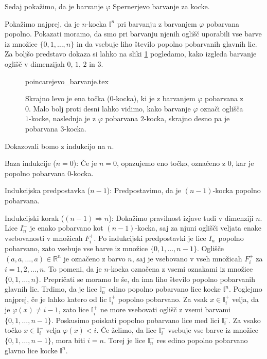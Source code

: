 \documentclass[mat1]{fmfdelo}
\newcommand{\R}{\mathbb R}
\newcommand{\I}{\mathbb I}
\newcommand{\0}{0}
\begin{document}
Sedaj pokažimo, da je barvanje $\varphi$ Spernerjevo barvanje za kocke.
\begin{dokaz}
Pokažimo najprej, da je $n$-kocka $\I^n$ pri barvanju z barvanjem $\varphi$ pobarvana popolno. Pokazati moramo, da smo pri barvanju njenih oglišč uporabili vse barve iz množice $\{ 0, 1, \dots, n \}$ in da vsebuje liho število popolno pobarvanih glavnih lic. Za boljšo predstavo dokaza si lahko na sliki \ref{fig:PMcolor} pogledamo, kako izgleda barvanje oglišč v dimenzijah $0$, $1$, $2$ in $3$.
\begin{figure}[h!]
	\centering
	{poincarejevo_barvanje.tex}
	\caption{Skrajno levo je ena točka ($0$-kocka), ki je z barvanjem $\varphi$ pobarvana z $0$. Malo bolj proti desni lahko vidimo, kako barvanje $\varphi$ označi oglišča $1$-kocke, naslednja je z $\varphi$ pobarvana $2$-kocka, skrajno desno pa je pobarvana $3$-kocka.}\label{fig:PMcolor}
\end{figure}
Dokazovali bomo z indukcijo na $n$.

Baza indukcije ($n = 0$):
Če je $n=0$, opazujemo eno točko, označeno z $0$, kar je popolno pobarvana $0$-kocka.

Indukcijska predpostavka ($n - 1$):
Predpostavimo, da je $(n - 1)$-kocka popolno pobarvana.

Indukcijski korak ($(n - 1) \Longrightarrow n$):
Dokažimo pravilnost izjave tudi v dimenziji $n$. Lice $I_n^-$ je enako pobarvano kot $(n-1)$-kocka, saj za njuni oglišči veljata enake vsebovanosti v množicah $F_i^+$. Po indukcijski predpostavki je lice $I_n^-$ popolno pobarvano, zato vsebuje vse barve iz množice $\{ 0, 1, \dots, n-1\}$. Oglišče $(a, a, \dots, a) \in \R^n$ je označeno z barvo $n$, saj je vsebovano v vseh množicah $F_i^+$ za $i = 1, 2, \dots, n$. To pomeni, da je $n$-kocka označena z vsemi oznakami iz množice $\{ 0, 1, \dots, n \}$. Prepričati se moramo le še, da ima liho število popolno pobarvanih glavnih lic. 
Trdimo, da je lice $\I_n^-$ edino popolno pobarvano lice kocke $\I^n$. Poglejmo najprej, če je lahko katero od lic $\I_i^+$ popolno pobarvano. Za vsak $x \in \I_i^+$ velja, da je $\varphi (x) \neq i-1$, zato lice $\I_i^+$ ne more vsebovati oglišč z vsemi barvami $\{ 0, 1, \dots, n - 1 \}$. Poskusimo poiskati popolno pobarvano lice med lici $\I_i^-$. Za vsako točko $x \in \I_i^-$ velja $\varphi (x) < i$. Če želimo, da lice $\I_i^-$ vsebuje vse barve iz množice $\{ 0, 1, \dots, n - 1 \}$, mora biti $i = n$. Torej je lice $\I_n^-$ res edino popolno pobarvano glavno lice kocke $\I^n$.


\end{dokaz}
\end{document}
